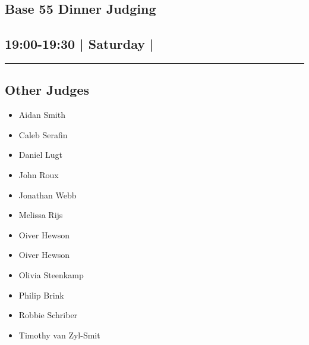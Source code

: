 \documentclass[10pt, A5]{article}
\begin{document}
	

		\begin{framed}
			\begin{minipage}{\textwidth}

			\setcounter{section}{70}
							\section{\faStar \: Base 55 \faStar \: Dinner Judging}
						
			\subsection*{19:00-19:30 | Saturday | }

			\vspace{0.25cm}
			\hrule
			\vspace{0.25cm}


			\subsection*{Other Judges}
							

				\begin{multicols}{2}

			\begin{itemize}
											\item Aidan Smith
											\item Caleb Serafin
											\item Daniel Lugt
											\item John Roux
											\item Jonathan Webb
											\item Melissa Rijs
											\item Oiver Hewson
								\end{itemize}

			\vfill\null
			\columnbreak

			\begin{itemize}
											\item Oiver Hewson
											\item Olivia Steenkamp
											\item Philip Brink
											\item Robbie Schriber
											\item Timothy van Zyl-Smit
								\end{itemize}

			\vfill\null

			\end{multicols}


\end{minipage}
\end{framed}
\end{document}
